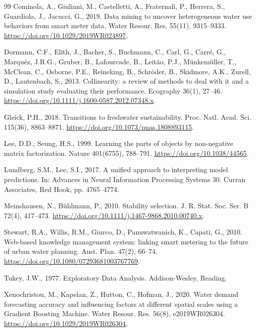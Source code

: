 \documentclass[a4paper,12pt]{article}
\begin{document}
\begin{thebibliography}{99}
Cominola, A., Giuliani, M., Castelletti, A., Fraternali, P., Herrera, S., Guardiola, J., Jacucci, G., 2019. Data mining to uncover heterogeneous water use behaviors from smart meter data. Water Resour. Res. 55(11), 9315--9333. \url{https://doi.org/10.1029/2019WR024897}.

Dormann, C.F., Elith, J., Bacher, S., Buchmann, C., Carl, G., Carr\'{e}, G., Marqu\'{e}z, J.R.G., Gruber, B., Lafourcade, B., Leit\~{a}o, P.J., M\"{u}nkem\"{u}ller, T., McClean, C., Osborne, P.E., Reineking, B., Schr\"{o}der, B., Skidmore, A.K., Zurell, D., Lautenbach, S., 2013. Collinearity: a review of methods to deal with it and a simulation study evaluating their performance. Ecography 36(1), 27--46. \url{https://doi.org/10.1111/j.1600-0587.2012.07348.x}.

Gleick, P.H., 2018. Transitions to freshwater sustainability. Proc. Natl. Acad. Sci. 115(36), 8863--8871. \url{https://doi.org/10.1073/pnas.1808893115}.

Lee, D.D., Seung, H.S., 1999. Learning the parts of objects by non-negative matrix factorization. Nature 401(6755), 788--791. \url{https://doi.org/10.1038/44565}.

Lundberg, S.M., Lee, S.I., 2017. A unified approach to interpreting model predictions. In: Advances in Neural Information Processing Systems 30. Curran Associates, Red Hook, pp. 4765--4774.

Meinshausen, N., B\"{u}hlmann, P., 2010. Stability selection. J. R. Stat. Soc. Ser. B 72(4), 417--473. \url{https://doi.org/10.1111/j.1467-9868.2010.00740.x}.

Stewart, R.A., Willis, R.M., Giurco, D., Panuwatwanich, K., Capati, G., 2010. Web-based knowledge management system: linking smart metering to the future of urban water planning. Aust. Plan. 47(2), 66--74. \url{https://doi.org/10.1080/07293681003767769}.

Tukey, J.W., 1977. Exploratory Data Analysis. Addison-Wesley, Reading.

Xenochristou, M., Kapelan, Z., Hutton, C., Hofman, J., 2020. Water demand forecasting accuracy and influencing factors at different spatial scales using a Gradient Boosting Machine. Water Resour. Res. 56(8), e2019WR026304. \url{https://doi.org/10.1029/2019WR026304}.

\end{thebibliography}
\end{document}
